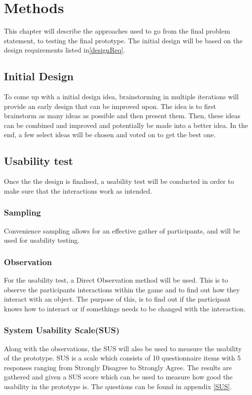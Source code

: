 \chapter{Methods}\label{chap:methods}
    This chapter will describe the approaches used to go from the final problem statement, to testing the final prototype. The initial design will be based on the design requirements listed in\autoref{designReq}.
    
    \section{Initial Design}
    To come up with a initial design idea, brainstorming in multiple iterations will provide an early design that can be improved upon. The idea is to first brainstorm as many ideas as possible and then present them. Then, these ideas can be combined and improved and potentially be made into a better idea. In the end, a few select ideas will be chosen and voted on to get the best one.

    \section{Usability test}
    Once the the design is finalised, a usability test will be conducted in order to make sure that the interactions work as intended.
    
    \subsection{Sampling}
    Convenience sampling allows for an effective gather of participants, and will be used for usability testing\cite{bjoernerBog}.   
    
    \subsection{Observation}
    For the usability test, a Direct Observation method will be used\cite{bjoernerBog}. This is to observe the participants interactions within the game and to find out how they interact with an object. The purpose of this, is to find out if the participant knows how to interact or if somethings needs to be changed with the interaction.
    
    \subsection{System Usability Scale(SUS)}
    Along with the observations, the SUS will also be used to measure the usability of the prototype. SUS is a scale which consists of 10 questionnaire items with 5 responses ranging from Strongly Disagree to Strongly Agree. The results are gathered and given a SUS score which can be used to measure how good the usability in the prototype is\cite{SUS}. The questions can be found in appendix \ref{SUS}.
    

